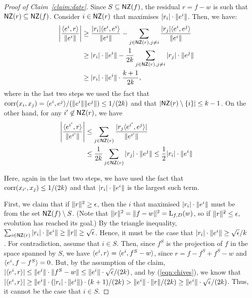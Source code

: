 \begin{proof}[Proof of Claim~\ref{claim:date}] Since $S \subseteq \mathsf{NZ}(f)$, the
residual $r = f - w$ is such that $\mathsf{NZ}(r) \subseteq \mathsf{NZ}(f)$. Consider $i \in \mathsf{NZ}(r)$
that maximises $|r_i|\cdot \Vert e^i \Vert$. Then, we have:
\begin{align}
\left|\frac{\langle e^i, r \rangle}{\Vert e^i \Vert} \right| &\geq
\frac{|r_i|\langle e^i, e^i \rangle}{\Vert e^i \Vert} - \sum_{j \in \mathsf{NZ}(r), j \neq i}
\frac{|r_j|\langle e^i, e^j \rangle}{\Vert e^i \Vert} \nonumber  \\
&\geq |r_i|\cdot \Vert e^i \Vert - \frac{1}{2k} \sum_{j \in \mathsf{NZ}(r), j \neq i}
|r_j| \cdot \Vert e^j \Vert \label{eqn:chives} \\
&\geq |r_i| \cdot \Vert e^i \Vert \cdot \frac{k+1}{2k}, \nonumber
\end{align}
where in the last two steps we used the fact that $\mathrm{corr}(x_i, x_j) =
\langle e^i, e^j \rangle/(\Vert e^i \Vert \Vert e^j \Vert) \leq 1/(2k)$ and that $|\mathsf{NZ}(r)
\setminus \{ i \}| \leq k-1$. On the other hand, for any $i^\prime \not\in
\mathsf{NZ}(r)$, we have
\begin{align}
\left| \frac{\langle e^{i^\prime}, r \rangle}{\Vert e^{i^\prime} \Vert} \right| &\leq
\sum_{j \in \mathsf{NZ}(r)} \frac{|r_j\langle e^{i^\prime}, e^j \rangle|}{\Vert e^{i^\prime} \Vert}
\nonumber \\
&\leq \frac{1}{2k} \sum_{j \in \mathsf{NZ}(r)} |r_j| \cdot \Vert e^j \Vert \leq \frac{1}{2}
|r_i| \cdot \Vert e^i \Vert \label{eqn:dill}
\end{align}

\noindent Here, again in the last two steps, we have used the fact that
$\mathrm{corr}(x_{i^\prime}, x_j) \leq 1/(2k)$ and that $|r_i| \cdot \Vert e^i \Vert$ is
the largest such term.

First, we claim that if $\Vert r \Vert^2 \geq \epsilon$, then the $i$ that
maximised $|r_i| \cdot \Vert e^i \Vert$ must be from the set $\mathsf{NZ}(f) \setminus
S$. (Note that $\Vert r \Vert^2 = \Vert f - w \Vert^2 = \mathrm{L}_{f, D}(w)$, so if
$\Vert r \Vert^2 \leq \epsilon$, evolution has reached its goal.) By the
triangle inequality, $\sum_{i \in \mathsf{NZ}(r)} |r_i| \cdot \Vert e^i \Vert \geq
\Vert r \Vert \geq \sqrt{\epsilon}$. Hence, it must be the case that $|r_i| \cdot
\Vert e^i \Vert \geq \sqrt{\epsilon}/{k}$. For contradiction, assume that $i \in
S$. Then, since $f^S$ is the projection of $f$ in the space spanned by $S$, we
have $\langle e^i, r \rangle = \langle e^i, f^S - w \rangle$, since $r = f - f^S + f^S - w$ and
$\langle e^i, f - f^S \rangle = 0$. But, by the assumption of the claim, $|\langle e^i, r \rangle|\leq
\Vert e^i \Vert \cdot \Vert f^S - w \Vert \leq \Vert e^i \Vert \cdot
\sqrt{\epsilon}/(2k)$, and by (\ref{eqn:chives}), we know that $|\langle e^i, r \rangle|
\geq \Vert e^i \Vert \cdot (|r_i| \cdot \Vert e^i \Vert) \cdot (k+1)/(2k) >
\Vert e^i \Vert \cdot \Vert r \Vert / (2k) \ge \Vert e^i \Vert \cdot \sqrt{\epsilon}/(2k)$.
Thus, it cannot be the case that $i \in S$.


\end{proof}

